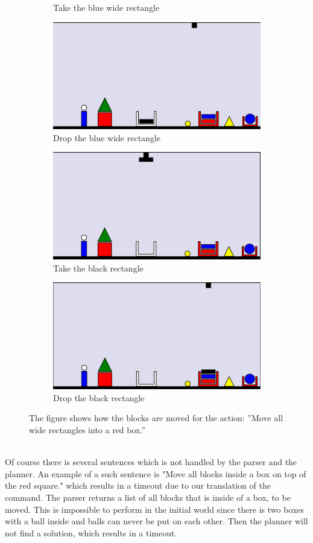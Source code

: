 \begin{figure}
\begin{subfigure}{.5\textwidth}
  \caption{Take the blue wide rectangle}
  \label{fig:8}
\end{subfigure}
\begin{subfigure}{.5\textwidth}
  \centering
  \includegraphics[width=.7\linewidth]{fig/9.png}
  \caption{Drop the blue wide rectangle}
  \label{fig:9}
\end{subfigure}%
\begin{subfigure}{.5\textwidth}
  \centering
  \includegraphics[width=.7\linewidth]{fig/10.png}
  \caption{Take the black rectangle}
  \label{fig:10}
\end{subfigure}
\begin{subfigure}{.5\textwidth}
  \centering
  \includegraphics[width=.7\linewidth]{fig/11.png}
  \caption{Drop the black rectangle}
  \label{fig:11}
\end{subfigure}
\caption{The figure shows how the blocks are moved for the action: ''Move all wide rectangles into a red 
box.''}
\label{fig:moveex}
\end{figure}\\
Of course there is several sentences which is not handled by the parser and the planner. An example of a such sentence is "Move all blocks inside a box on top of the red square." which results in a timeout due to our translation of the command. The parser returns a list of all blocks that is inside of a box, to be moved. This is impossible to perform in the initial world since there is two boxes with a ball inside and balls can never be put on each other. Then the planner will not find a solution, which results in a timeout.\\\\
